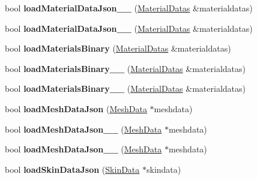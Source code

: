 \begin{DoxyCompactItemize}
\item 
\mbox{\label{classBundle3D_a88eb1243de98974ec6ce6673139a5002}} 
bool {\bfseries load\+Material\+Data\+Json\+\_\+\_} (\hyperlink{structMaterialDatas}{Material\+Datas} \&materialdatas)
\item 
\mbox{\label{classBundle3D_a2127473dc7b6e921ccfb6da63fee147e}} 
bool {\bfseries load\+Material\+Data\+Json\+\_\+\_} (\hyperlink{structMaterialDatas}{Material\+Datas} \&materialdatas)
\item 
\mbox{\label{classBundle3D_a0b164bb390a863acb0f3f3099843641a}} 
bool {\bfseries load\+Materials\+Binary} (\hyperlink{structMaterialDatas}{Material\+Datas} \&materialdatas)
\item 
\mbox{\label{classBundle3D_af372519f7bdc9027079b9af883944d2b}} 
bool {\bfseries load\+Materials\+Binary\+\_\+\_} (\hyperlink{structMaterialDatas}{Material\+Datas} \&materialdatas)
\item 
\mbox{\label{classBundle3D_a48cb5a678aebe33cc4407cf740112d3a}} 
bool {\bfseries load\+Materials\+Binary\+\_\+\_} (\hyperlink{structMaterialDatas}{Material\+Datas} \&materialdatas)
\item 
\mbox{\label{classBundle3D_a532229046a8cca11011bb82254fcdf3d}} 
bool {\bfseries load\+Mesh\+Data\+Json} (\hyperlink{structMeshData}{Mesh\+Data} $\ast$meshdata)
\item 
\mbox{\label{classBundle3D_a7460364371642a2a4eb03e8e818b90de}} 
bool {\bfseries load\+Mesh\+Data\+Json\+\_\+\_} (\hyperlink{structMeshData}{Mesh\+Data} $\ast$meshdata)
\item 
\mbox{\label{classBundle3D_a346f5c2e1cefb5bcedc3a85255021aaa}} 
bool {\bfseries load\+Mesh\+Data\+Json\+\_\+\_} (\hyperlink{structMeshData}{Mesh\+Data} $\ast$meshdata)
\item 
\mbox{\label{classBundle3D_a8d937df77ebe15c51619cf31c205443c}} 
bool {\bfseries load\+Skin\+Data\+Json} (\hyperlink{structSkinData}{Skin\+Data} $\ast$skindata)
\item 

\end{DoxyCompactItemize}

